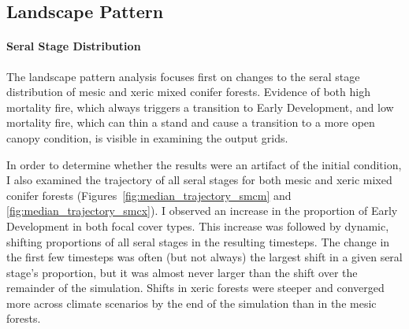 \subsection*{Landscape Pattern}

\paragraph*{Seral Stage Distribution}
The landscape pattern analysis focuses first on changes to the seral stage distribution of mesic and xeric mixed conifer forests. Evidence of both high mortality fire, which always triggers a transition to Early Development, and low mortality fire, which can thin a stand and cause a transition to a more open canopy condition, is visible in examining the output grids.

In order to determine whether the results were an artifact of the initial condition, I also examined the trajectory of all seral stages for both mesic and xeric mixed conifer forests (Figures~\ref{fig:median_trajectory_smcm} and \ref{fig:median_trajectory_smcx}). I observed an increase in the proportion of Early Development in both focal cover types. This increase was followed by dynamic, shifting proportions of all seral stages in the resulting timesteps. The change in the first few timesteps was often (but not always) the largest shift in a given seral stage's proportion, but it was almost never larger than the shift over the remainder of the simulation. Shifts in xeric forests were steeper and converged more across climate scenarios by the end of the simulation than in the mesic forests.


